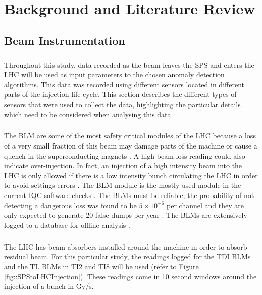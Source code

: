 \chapter{Background and Literature Review}


\section{Beam Instrumentation}
\label{sec::beam_instrumentation}
\paragraph{ }Throughout this study, data recorded as the beam leaves the \acs{SPS} and enters the \acs{LHC} will be used as input parameters to the chosen anomaly detection algorithms. This data was recorded using different sensors located in different parts of the injection life cycle. This section describes the different types of sensors that were used to collect the data, highlighting the particular details which need to be considered when analysing this data.

\paragraph{ }The \ac{BLM} are some of the most safety critical modules of the \acs{LHC} because a loss of a very small fraction of this beam may damage parts of the machine or cause a quench in the superconducting magnets \cite{Holzer2006}. A high beam loss reading could also indicate over-injection. In fact, an injection of a high intensity beam into the LHC is only allowed if there is a low intensity bunch circulating the LHC in order to avoid settings errors \cite{Kain2010}. The \acs{BLM} module is the mostly used module in the current IQC software checks \cite{Drosdal2011}. The \acs{BLM}s must be reliable; the probability of not detecting a dangerous loss was found to be $5\times10^{-6}$ per channel and they are only expected to generate 20 false dumps per year \cite{Holzer2006}. The \acs{BLM}s are extensively logged to a database for offline analysis \cite{Holzer2006}. 

\paragraph{ }The \acs{LHC} has beam absorbers installed around the machine in order to absorb residual beam. For this particular study, the readings logged for the \ac{TDI} \acs{BLM}s and the \ac{TL} \acs{BLM}s in TI2 and TI8 will be used (refer to Figure \ref{fig::SPStoLHCInjection}). These readings come in 10 second windows around the injection of a bunch in \ac{Gy/s}.

